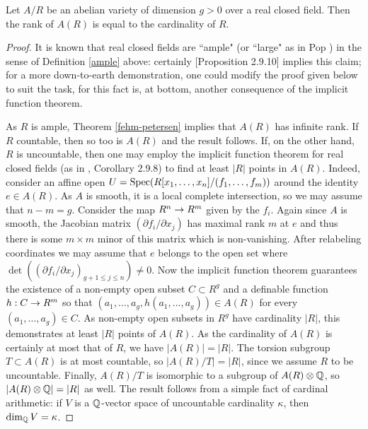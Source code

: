 \begin{proposition}
\label{prop-freepart}
Let $A/R$ be an abelian variety of dimension $g>0$ over a real closed field. Then the rank of $A(R)$ is equal to the cardinality of $R$.
\end{proposition}
\begin{proof}
It is known that real closed fields are ``ample" (or ``large" as in Pop \cite{pop}) in the sense of Definition \ref{ample} above: certainly \cite{real}[Proposition 2.9.10] implies this claim; for a more down-to-earth demonstration, one could modify the proof given below to suit the task, for this fact is, at bottom, another consequence of the implicit function theorem. 

\indent As $R$ is ample, Theorem \ref{fehm-petersen} implies that $A(R)$ has infinite rank. If $R$ countable, then so too is $A(R)$ and the result follows. If, on the other hand, $R$ is uncountable, then one may employ the implicit function theorem for real closed fields (as in \cite{real}, Corollary 2.9.8) to find at least $|R|$ points in $A(R)$. Indeed, consider an affine open $U=\operatorname{Spec}(R[x_1,\dots, x_n]/(f_1,\dots, f_m))$ around the identity $e\in A(R)$. As $A$ is smooth, it is a local complete intersection, so we may assume that $n-m=g$. Consider the map $R^n\rightarrow R^m$ given by the $f_i$. Again since $A$ is smooth, the Jacobian matrix $(\partial f_i / \partial x_j)$ has maximal rank $m$ at $e$ and thus there is some $m\times m$ minor of this matrix which is non-vanishing. After relabeling coordinates we may assume that $e$ belongs to the open set where $\det( (\partial f_i / \partial x_j)_{g+1\leq j\leq n})\neq 0$. Now the implicit function theorem guarantees the existence of a non-empty open subset $C\subset R^g$ and a definable function $h:C\rightarrow R^m$ so that $(a_1,\dots, a_g, h(a_1,\dots, a_g))\in A(R)$ for every $(a_1,\dots, a_g)\in C$. As non-empty open subsets in $R^g$ have cardinality $|R|$, this demonstrates at least $|R|$ points of $A(R)$. As the cardinality of $A(R)$ is certainly at most that of $R$, we have $|A(R)|=|R|$. \newline \indent The torsion subgroup $T\subset A(R)$ is at most countable, so $|A(R)/T|=|R|$, since we assume $R$ to be uncountable. Finally, $A(R)/T$ is isomorphic to a subgroup of $A(R)\otimes \mathbb{Q}$, so $|A(R)\otimes \mathbb{Q}|=|R|$ as well. The result follows from a simple fact of cardinal arithmetic: if $V$ is a $\mathbb{Q}$-vector space of uncountable cardinality $\kappa$, then $\operatorname{dim}_{\mathbb{Q}} V=\kappa$.
\end{proof}

